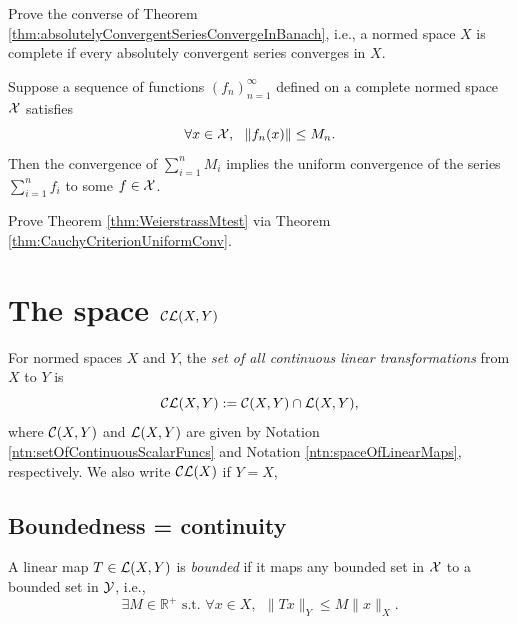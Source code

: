 \begin{exc}
  Prove the converse of Theorem
  \ref{thm:absolutelyConvergentSeriesConvergeInBanach},
  i.e., a normed space $X$ is complete
  if every absolutely convergent series converges in $X$.
\end{exc}

\begin{thm}
  \label{thm:WeierstrassMtest}
  Suppose a sequence of functions $(f_n)_{n=1}^{\infty}$ 
  defined on a complete normed space ${\cal X}$ satisfies
  \begin{equation}
    \label{eq:WeierstrassMtest}
    \forall x\in{\cal X},\ \ \|f_n(x)\|\le M_n.
  \end{equation}
  Then the convergence of $\sum_{i=1}^n M_i$ 
  implies the uniform convergence of the series $\sum_{i=1}^n f_i$ 
  to some  $f\in{\cal X}$.
\end{thm}

\begin{exc}
  Prove Theorem \ref{thm:WeierstrassMtest}
  via Theorem \ref{thm:CauchyCriterionUniformConv}. 
\end{exc}

\section{The space ${\cal CL}(X,Y)$}
\label{sec:space-CLXY}

\begin{ntn}
  For normed spaces $X$ and $Y$,
  the \emph{set of all continuous linear transformations}
  from $X$ to $Y$ is 
  \begin{equation}
    \label{eq:CL-XY}
    {\cal CL}(X,Y) := {\cal C}(X,Y) \cap {\cal L}(X,Y),
  \end{equation}
  where ${\cal C}(X,Y)$ and ${\cal L}(X,Y)$
  are given by 
  Notation \ref{ntn:setOfContinuousScalarFuncs}
  and Notation \ref{ntn:spaceOfLinearMaps}, respectively.
  We also write ${\cal CL}(X)$ if $Y=X$, 
\end{ntn}

\subsection{Boundedness = continuity}

\begin{defn}
  \label{def:boundedLinearMap}
  A linear map $T\in {\cal L}(X,Y)$ is \emph{bounded} if
  it maps any bounded set in ${\cal X}$
  to a bounded set in ${\cal Y}$, i.e., 
  \begin{equation}
    \label{eq:boundedLinearMap}
    \exists M\in \mathbb{R}^+ \text{ s.t. }
    \forall x\in X,\ \  \|Tx\|_Y\le M \|x\|_X.
  \end{equation}
\end{defn}

